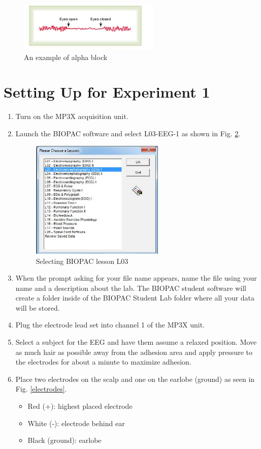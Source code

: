 \documentclass{article}
\begin{document}
\begin{figure}[h]
\centering
\includegraphics[width=0.6\textwidth]{../images/EEG_3.jpg}	
\caption{An example of alpha block}
\label{alphablock}
\end{figure}

\section*{Setting Up for Experiment 1}
\begin{enumerate}
	\item Turn on the MP3X acquisition unit.
	\item Launch the BIOPAC software and select L03-EEG-1 as shown in Fig. \ref{lesson}.
		\begin{figure}[h]
		\centering
	\includegraphics[width=0.6\textwidth]{../images/EEG_4.jpg}	
		\caption{Selecting BIOPAC lesson L03}
		\label{lesson}
		\end{figure}

	\item When the prompt asking for your file name appears, name the file using your name and a description about the lab. The BIOPAC student software will create a folder inside of the BIOPAC Student Lab folder where all your data will be stored.
	\item Plug the electrode lead set into channel 1 of the MP3X unit.
	\item Select a subject for the EEG and have them assume a relaxed position. Move as much hair as possible away from the adhesion area and apply pressure to the electrodes for about a minute to maximize adhesion.
	\item Place two electrodes on the scalp and one on the earlobe (ground) as seen in Fig. \ref{electrodes}.
		\begin{itemize}
			\item Red (+): highest placed electrode
			\item White (-): electrode behind ear
			\item Black (ground): earlobe
		\end{itemize}
		

\end{enumerate}
\end{document}
